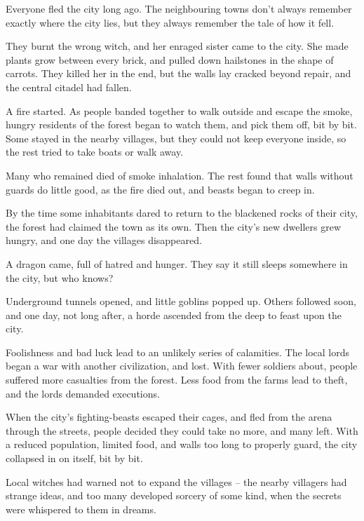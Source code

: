 \begin{multicols}{2}
\label{lostCataclysm}

Everyone fled the city long ago.
The neighbouring towns don't always remember exactly where the city lies, but they always remember the tale of how it fell.

\begin{dlist}
  \item
  They burnt the wrong witch, and her enraged sister came to the city.
  She made plants grow between every brick, and pulled down hailstones in the shape of carrots.
  They killed her in the end, but the walls lay cracked beyond repair, and the central citadel had fallen.
  \item
  A fire started.
  As people banded together to walk outside and escape the smoke, hungry residents of the forest began to watch them, and pick them off, bit by bit.
  Some stayed in the nearby villages, but they could not keep everyone inside, so the rest tried to take boats or walk away.

  Many who remained died of smoke inhalation.
  The rest found that walls without guards do little good, as the fire died out, and beasts began to creep in.

  By the time some inhabitants dared to return to the blackened rocks of their city, the forest had claimed the town as its own.
  Then the city's new dwellers grew hungry, and one day the villages disappeared.
  \item
  A dragon came, full of hatred and hunger.
  They say it still sleeps somewhere in the city, but who knows?
  \item
  Underground tunnels opened, and little goblins popped up.
  Others followed soon, and one day, not long after, a horde ascended from the \gls{deep} to feast upon the city.
  \item
  Foolishness and bad luck lead to an unlikely series of calamities.
  The local lords began a war with another civilization, and lost.
  With fewer soldiers about, people suffered more casualties from the forest.
  Less food from the farms lead to theft, and the lords demanded executions.

  When the city's fighting-beasts escaped their cages, and fled from the arena through the streets, people decided they could take no more, and many left.
  With a reduced population, limited food, and walls too long to properly guard, the city collapsed in on itself, bit by bit.
  \item
  \ifodd\value{r4}
    Local witches had warned not to expand the villages -- the nearby villagers had strange ideas, and too many developed sorcery of some kind, when the secrets were whispered to them in dreams.


\end{dlist}
\end{multicols}
